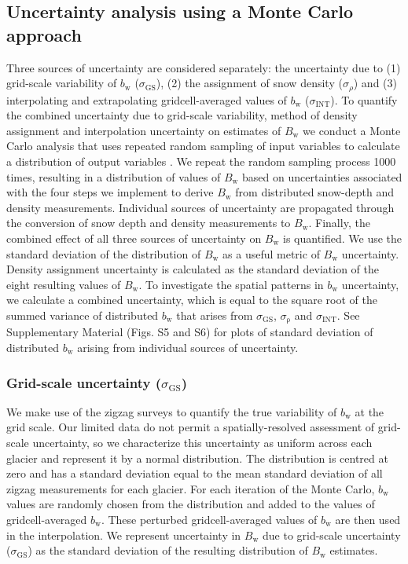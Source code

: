 \documentclass[review,oneside, letterpaper]{igs}
\begin{document}
\subsection{Uncertainty analysis using a Monte Carlo approach}

Three sources of uncertainty are considered separately: the uncertainty due to (1) grid-scale variability of $b_\mathrm{w}$ ($\sigma_{\mathrm{GS}}$), (2) the assignment of snow density ($\sigma_{\rho}$) and (3) interpolating and extrapolating gridcell-averaged values of $b_\mathrm{w}$ ($\sigma_{\mathrm{INT}}$). To quantify the combined uncertainty due to grid-scale variability, method of density assignment and interpolation uncertainty on estimates of $B_\mathrm{w}$ we conduct a Monte Carlo analysis that uses repeated random sampling of input variables to calculate a distribution of output variables \citep{Metropolis1949}. We repeat the random sampling process 1000 times, resulting in a distribution of values of $B_\mathrm{w}$ based on uncertainties associated with the four steps we implement to derive $B_\mathrm{w}$ from distributed snow-depth and density measurements. 
Individual sources of uncertainty are propagated through the conversion of snow depth and density measurements to $B_\mathrm{w}$. Finally, the combined effect of all three sources of uncertainty on $B_\mathrm{w}$ is quantified. We use the standard deviation of the distribution of $B_\mathrm{w}$ as a useful metric of $B_\mathrm{w}$ uncertainty. Density assignment uncertainty is calculated as the standard deviation of the eight resulting values of $B_\mathrm{w}$. To investigate the spatial patterns in $b_\mathrm{w}$ uncertainty, we calculate a combined uncertainty, which is equal to the square root of the summed variance of distributed $b_\mathrm{w}$ that arises from $\sigma_{\mathrm{GS}}$, $\sigma_{\mathrm{\rho}}$ and $\sigma_{\mathrm{INT}}$. See Supplementary Material (Figs. S5 and S6) for plots of standard deviation of distributed $b_\mathrm{w}$ arising from individual sources of uncertainty.

	\subsubsection{Grid-scale uncertainty ($\sigma_{\mathrm{GS}}$)}
We make use of the zigzag surveys to quantify the true variability of $b_\mathrm{w}$ at the grid scale. Our limited data do not permit a spatially-resolved assessment of grid-scale uncertainty, so we characterize this uncertainty as uniform across each glacier and represent it by a normal distribution. The distribution is centred at zero and has a standard deviation equal to the mean standard deviation of all zigzag measurements for each glacier. For each iteration of the Monte Carlo, $b_\mathrm{w}$ values are randomly chosen from the distribution and added to the values of gridcell-averaged $b_\mathrm{w}$. These perturbed gridcell-averaged values of $b_\mathrm{w}$ are then used in the interpolation. We represent uncertainty in $B_\mathrm{w}$ due to grid-scale uncertainty ($\sigma_{\mathrm{GS}}$) as the standard deviation of the resulting distribution of $B_\mathrm{w}$ estimates.  
\end{document}
